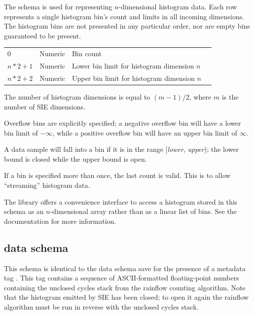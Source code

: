 \documentclass{article}
\begin{document}
The  schema is used for representing
$n$-dimensional histogram data.  Each row represents a single
histogram bin's count and limits in all incoming dimensions.  The
histogram bins are not presented in any particular order, nor are
empty bins guaranteed to be present.

\begin{center}
  \begin{tabular}{llll}
    \schemaheader{} \\ \hline
    0 & Numeric & Bin count & \undef{} \\
    $n * 2 + 1$ & Numeric & 
      Lower bin limit for histogram dimension $n$ & \undef{} \\
    $n * 2 + 2$ & Numeric & 
      Upper bin limit for histogram dimension $n$ & \undef{}
  \end{tabular}
\end{center}

The number of histogram dimensions is equal to $(m - 1) / 2$, where
$m$ is the number of SIE dimensions.

Overflow bins are explicitly specified; a negative overflow bin will
have a lower bin limit of $-\infty$, while a positive overflow bin
will have an upper bin limit of $\infty$.

A data sample will fall into a bin if it is in the range
[\emph{lower}, \emph{upper}); the lower bound is closed while the
upper bound is open.

If a bin is specified more than once, the last count is valid.  This
is to allow ``streaming'' histogram data.

The \libsie{} library offers a convenience interface to access a
histogram stored in this schema as an $n$-dimensional array rather
than as a linear list of bins.  See the \libsie{} documentation for
more information.

\subsection{ data schema}

This schema is identical to the  data schema save
for the presence of a metadata tag
.  This tag contains a sequence
of ASCII-formatted floating-point numbers containing the unclosed
cycles stack from the rainflow counting algorithm.  Note that the
histogram emitted by SIE has been closed; to open it again the
rainflow algorithm must be run in reverse with the unclosed cycles
stack.
\end{document}
